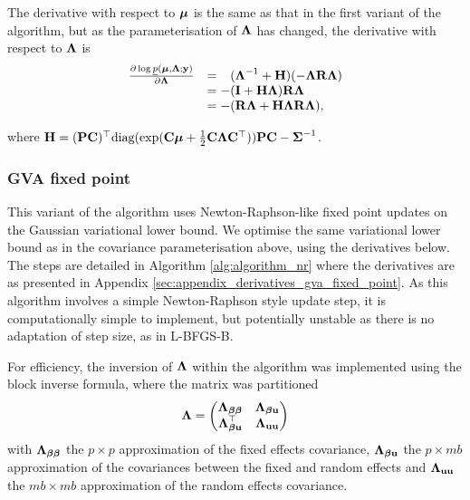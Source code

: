 \noindent The derivative with respect to ${\boldsymbol \mu}$ is the same as that in the
first variant of the algorithm, but as the parameterisation of ${\boldsymbol \Lambda}$ has
changed, the  derivative with respect to ${\boldsymbol \Lambda}$ is 
\begin{equation}
\label{eq:gva_lower_bound_precision_deriv}
\begin{array}{ll}
	\frac{\partial \log \underline{p}({\boldsymbol \mu}, {\boldsymbol \Lambda}; {\bf y})}{\partial {\boldsymbol\Lambda}}
	  & = \hphantom{-}({\boldsymbol \Lambda}^{-1} + {\bf H})(-{\boldsymbol \Lambda} {\bf R} {\boldsymbol \Lambda}) \\
	  & = -({\bf I} + {\bf H}{\boldsymbol \Lambda}){\bf R}{\boldsymbol \Lambda} \\
	  & = - ({\bf R}{\boldsymbol \Lambda} + {\bf H}{\boldsymbol \Lambda}{\bf R}{\boldsymbol \Lambda}),
\end{array}
\end{equation}
		
\noindent where ${\bf H} = ({\bf P} {\bf C})^\top \text{diag}(\exp({\bf C} {\boldsymbol \mu} + \frac{1}{2}
{\bf C} {\boldsymbol \Lambda} {\bf C}^\top)) {\bf P} {\bf C} - {\boldsymbol \Sigma}^{-1}$.
		
\subsubsection{GVA fixed point} 	%

This variant of the algorithm uses Newton-Raphson-like fixed point updates on
the Gaussian variational lower bound. We optimise the same variational lower
bound as in the covariance parameterisation above, using the derivatives below.
The steps are detailed in Algorithm \ref{alg:algorithm_nr} where the
derivatives are as presented in Appendix
\ref{sec:appendix_derivatives_gva_fixed_point}. As this algorithm involves a
simple Newton-Raphson style update step, it is computationally simple to
implement, but potentially unstable as there is no adaptation of step size, as
in L-BFGS-B.

For efficiency, the inversion of ${\boldsymbol \Lambda}$ within the algorithm was
implemented using the block inverse formula, where	the matrix was partitioned
\[
	{\boldsymbol \Lambda} =
	\begin{pmatrix}
		{\boldsymbol\Lambda}_{{\boldsymbol \beta} {\boldsymbol \beta}} & {\boldsymbol \Lambda}_{{\boldsymbol \beta} {\bf u}} \\
		{\boldsymbol \Lambda}_{{\boldsymbol \beta} {\bf u}}^\top & {\boldsymbol \Lambda}_{{\bf u} {\bf u}}
	\end{pmatrix}
\]
with ${\boldsymbol \Lambda}_{{\boldsymbol \beta} {\boldsymbol \beta}}$ the $p \times p$ approximation of the fixed
effects covariance, ${\boldsymbol \Lambda}_{{\boldsymbol \beta} {\bf u}}$ the $p \times mb$ approximation
of the covariances between the fixed and random effects and ${\boldsymbol \Lambda}_{{\bf u}
{\bf u}}$ the $mb \times mb$ approximation of the random effects covariance.

